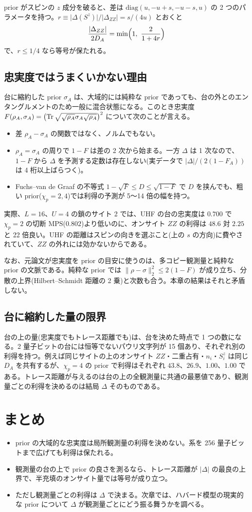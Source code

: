 prior がスピンの $z$ 成分を破ると、差は $\mathrm{diag}(u,-u+s,-u-s,u)$ の 2 つのパラメータを持つ。$r\equiv\lvert\Delta(S^z)\rvert/\lvert\Delta_{ZZ}\rvert=s/(4u)$ とおくと
\begin{equation}
  \frac{\lvert\Delta_{ZZ}\rvert}{2D_A}=\min\Bigl(1,\ \frac{2}{1+4r}\Bigr)
\end{equation}
で、$r\le1/4$ なら等号が保たれる。

\subsection{忠実度ではうまくいかない理由}
台に縮約した prior $\sigma_A$ は、大域的には純粋な prior であっても、台の外とのエンタングルメントのため一般に混合状態になる。このとき忠実度 $F(\rho_A,\sigma_A)=\bigl(\operatorname{Tr}\sqrt{\sqrt{\rho_A}\sigma_A\sqrt{\rho_A}}\bigr)^2$ について次のことが言える。
\begin{itemize}
  \item 差 $\rho_A-\sigma_A$ の関数ではなく、ノルムでもない。
  \item $\rho_A=\sigma_A$ の周りで $1-F$ は差の 2 次から始まる。一方 $\Delta$ は 1 次なので、$1-F$ から $\Delta$ を予測する定数は存在しない(実データで $\lvert\Delta\rvert/(2(1-F_A))$ は 4 桁以上ばらつく)。
  \item Fuchs--van de Graaf の不等式 $1-\sqrt F\le D\le\sqrt{1-F}$ で $D$ を挟んでも、粗い prior($\chi_p=2,4$)では利得の予測が 5〜14 倍の幅を持つ。
\end{itemize}
実際、$L=16$、$U=4$ の鎖のサイト 2 では、UHF の台の忠実度は $0.700$ で $\chi_p=2$ の切断 MPS($0.802$)より低いのに、オンサイト $ZZ$ の利得は $48.6$ 対 $2.25$ と 22 倍良い。UHF の距離はスピンの向きを選ぶこと(上の $s$ の方向)に費やされていて、$ZZ$ の外れには効かないからである。

なお、元論文が忠実度を prior の目安に使うのは、多コピー観測量と純粋な prior の文脈である。純粋な prior では $\lVert\rho-\sigma\rVert_2^2\le2(1-F)$ が成り立ち、分散の上界(Hilbert--Schmidt 距離の 2 乗)と次数も合う。本章の結果はそれと矛盾しない。

\subsection{台に縮約した量の限界}
台の上の量(忠実度でもトレース距離でも)は、台を決めた時点で 1 つの数になる。2 量子ビットの台には恒等でないパウリ文字列が 15 個あり、それぞれ別の利得を持つ。例えば同じサイトの上のオンサイト $ZZ$・二重占有・$n_i$・$S^z_i$ は同じ $D_A$ を共有するが、$\chi_p=4$ の prior で利得はそれぞれ $43.8$、$26.9$、$1.00$、$1.00$ である。トレース距離が与えるのは台の上の全観測量に共通の最悪値であり、観測量ごとの利得を決めるのは結局 $\Delta$ そのものである。

\section{まとめ}
\begin{itemize}
  \item prior の大域的な忠実度は局所観測量の利得を決めない。系を 256 量子ビットまで広げても利得は保たれる。
  \item 観測量の台の上で prior の良さを測るなら、トレース距離が $\lvert\Delta\rvert$ の最良の上界で、半充填のオンサイト量では等号が成り立つ。
  \item ただし観測量ごとの利得は $\Delta$ で決まる。次章では、ハバード模型の現実的な prior について $\Delta$ が観測量ごとにどう振る舞うかを調べる。
\end{itemize}
